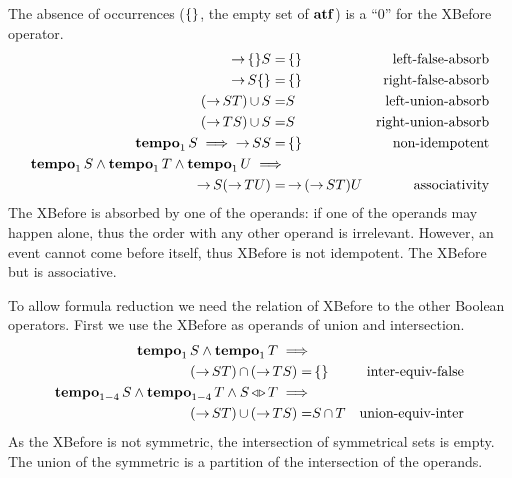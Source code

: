 \documentclass[en,twoside,onehalfspacing,phd]{risethesis}
\def\xbeforeop{\ensuremath\rightarrow}
\newcommand{\xbefore}[2]{\ensuremath #1 \xbeforeop #2 }
\def\tempoop{\ensuremath\operatorname{\mathbf{tempo}}}
\newcommand{\tempo}[2][1-4]{\ensuremath\tempoop_{#1} #2}
\def\independenteventsop{\ensuremath\operatorname{\triangleleft\triangleright}}
\newcommand{\independentevents}[2]{\ensuremath #1 \independenteventsop #2}
\def\False{\ensuremath\operatorname{\left\{\right\}}}
\def\algebraset{\ensuremath\operatorname{\mathbf{atf}}}
\newcommand{\parsin}[1]{\ensuremath\left( #1 \right)}
\def\union{\ensuremath\operatorname{\cup}}
\def\inter{\ensuremath\operatorname{\cap}}
\def\xbefore{\ensuremath\operatorname{\rightarrow}}
\begin{document}
The absence of occurrences ($\False$, the empty set of $\algebraset$) is a ``0'' for the XBefore operator.
%
\begin{subequations}
\begin{align}
\xbefore{\False}{S} =&
  \False &
  \text{left-false-absorb}
  \label{thm:xbefore-of-false-1}\\
%
\xbefore{S}{\False} =&
  \False &
  \text{right-false-absorb}
  \label{thm:xbefore-of-false-2}\\
%
\left(\xbefore{S}{T}\right) \union S =& S &
  \text{left-union-absorb}
  \label{thm:xbefore-sup-absorb-1}\\
%
\left(\xbefore{T}{S}\right) \union S =& S &
  \text{right-union-absorb}
  \label{thm:xbefore-sup-absorb-2}\\
%
\tempo[1]{S} \implies
  \xbefore{S}{S} =&
  \False &
  \text{non-idempotent}
  \label{thm:xbefore-not-idempotent}\\
%
\tempo[1]{S}\land\tempo[1]{T}\land \tempo[1]{U}\implies&\nonumber\\
  \xbefore{S}{(\xbefore{T}{U})} =&
  \xbefore{(\xbefore{S}{T})}{U} &
  \text{associativity}
%
\end{align}
\end{subequations}
%
The XBefore is absorbed by one of the operands: if one of the operands may happen alone, thus the order with any other operand is irrelevant.
However, an event cannot come before itself, thus XBefore is not idempotent.
The XBefore but is associative.

To allow formula reduction we need the relation of XBefore to the other Boolean operators.
First we use the XBefore as operands of union and intersection.
%
\begin{subequations}
\begin{align}
\tempo[1]{S} \land \tempo[1]{T}\implies&\nonumber\\
  \parsin{\xbefore{S}{T}} \inter \parsin{\xbefore{T}{S}} =&
  \False &
  \text{inter-equiv-false}
  \label{thm:xbefore-inf-equiv-bot}\\
%
\tempo{S} \land \tempo{T} \land \independentevents{S}{T}\implies&\nonumber\\
  \parsin{\xbefore{S}{T}} \union \parsin{\xbefore{T}{S}} =&
  S \inter T &
  \text{union-equiv-inter}
  \label{thm:xbefore-sup-equiv-inf}
%
\end{align}
\end{subequations}
%
As the XBefore is not symmetric, the intersection of symmetrical sets is empty.
The union of the symmetric is a partition of the intersection of the operands.
\end{document}
